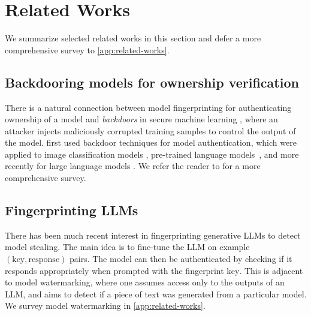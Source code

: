 \section{Related Works}
We summarize selected related works in this section and defer a more comprehensive survey to \cref{app:related-works}.

\subsection{Backdooring models for ownership verification}
There is a natural connection between model fingerprinting for authenticating ownership of a model and {\em backdoors} in secure machine learning \cite{gu2017badnets}, where an attacker injects maliciously corrupted training samples to control the output of the model.  \citet{adi2018turning,zhang2018protecting,guo2018watermarking} first used backdoor techniques for model authentication, which were applied to image classification models \cite{zhu2021fragile}, pre-trained language models~\cite{gu2023watermarkingpretrainedlanguagemodels,kurita2020weightpoisoningattackspretrained,li2021backdoorattackspretrainedmodels}, and more recently for large language models \cite{xu2024instructionalfingerprintinglargelanguage, cong2023have, russinovich2024heythatsmodelintroducing}.  We refer the reader to \citet{zhao2025a} for a more comprehensive survey.    

\subsection{Fingerprinting LLMs}
There has been much recent interest in fingerprinting generative LLMs to detect model stealing. The main idea is to fine-tune the LLM on example \((\mathrm{key}, \mathrm{response})\) pairs. The model can then be authenticated by checking if it responds appropriately when prompted with the fingerprint \(\mathrm{key}\). This is adjacent to model watermarking, where one assumes access only to the outputs of an LLM, and aims to detect if a piece of text was generated from a particular model. We survey model watermarking in \cref{app:related-works}.


